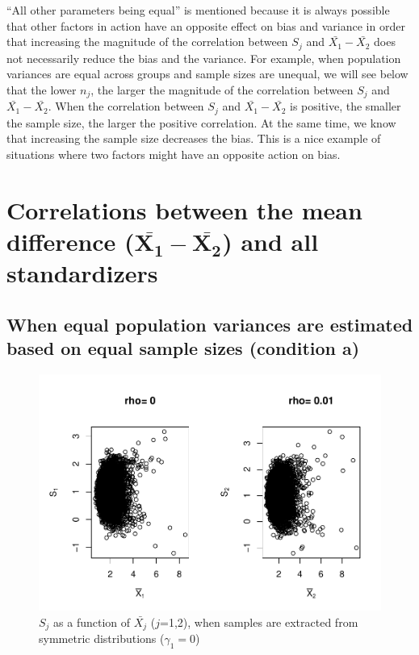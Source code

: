 \documentclass[
  english,
  man,mask]{apa6}
\begin{document}
``All other parameters being equal'' is mentioned because it is always possible that other factors in action have an opposite effect on bias and variance in order that increasing the magnitude of the correlation between \(S_j\) and \(\bar{X_1}-\bar{X_2}\) does not necessarily reduce the bias and the variance. For example, when population variances are equal across groups and sample sizes are unequal, we will see below that the lower \(n_j\), the larger the magnitude of the correlation between \(S_j\) and \(\bar{X_1}-\bar{X_2}\). When the correlation between \(S_j\) and \(\bar{X_1}-\bar{X_2}\) is positive, the smaller the sample size, the larger the positive correlation. At the same time, we know that increasing the sample size decreases the bias. This is a nice example of situations where two factors might have an opposite action on bias.

\hypertarget{correlations-between-the-mean-difference-bmbarx_1-barx_2-and-all-standardizers}{%
\section{\texorpdfstring{Correlations between the mean difference (\(\bm{\bar{X_1}-\bar{X_2}}\)) and all standardizers}{Correlations between the mean difference (\textbackslash bm\{\textbackslash bar\{X\_1\}-\textbackslash bar\{X\_2\}\}) and all standardizers}}\label{correlations-between-the-mean-difference-bmbarx_1-barx_2-and-all-standardizers}}

\hypertarget{when-equal-population-variances-are-estimated-based-on-equal-sample-sizes-condition-a}{%
\subsection{When equal population variances are estimated based on equal sample sizes (condition a)}\label{when-equal-population-variances-are-estimated-based-on-equal-sample-sizes-condition-a}}

\begin{figure}
\centering
\includegraphics{Correlation_files/figure-latex/pltSDMEANHombalsym-1.pdf}
\caption{\label{fig:pltSDMEANHombalsym}\(S_j\) as a function of \(\bar{X_j}\) (\(j\)=1,2), when samples are extracted from symmetric distributions (\(\gamma_1 = 0\))}
\end{figure}
\end{document}
